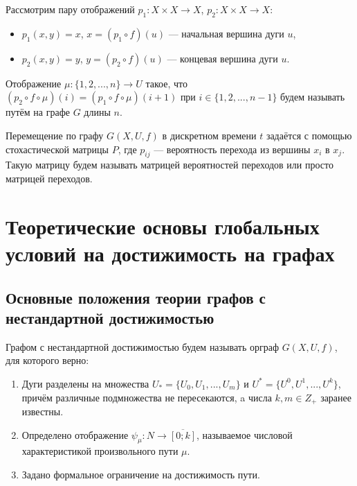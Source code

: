 	\begin{mydefinition}
		Рассмотрим пару отображений $p_1:X \times X\to X$, $p_2:X \times X\to X$:
		\begin{itemize}
			\item $p_1(x, y) = x$, $x = (p_1 \circ f)(u)$ --- начальная вершина дуги $u$,
			\item $p_2(x, y) = y$, $y = (p_2 \circ f)(u)$ --- концевая вершина дуги $u$.
		\end{itemize}
	\end{mydefinition}
	
	\begin{mydefinition}
		Отображение $\mu:\{1, 2, ... , n\} \to U$ такое, что 
		$(p_2 \circ f \circ \mu)(i) = (p_1 \circ f \circ \mu)(i + 1)$ при $i \in \{1, 2, ... , n-1\}$
		будем называть путём на графе $G$ длины $n$.
	\end{mydefinition}

	\begin{mydefinition}
		Перемещение по графу $G(X,U,f)$ в дискретном времени $t$ задаётся с помощью стохастической матрицы $P$, где $p_{ij}$ --- вероятность перехода из вершины $x_i$ в $x_j$.
		Такую матрицу будем называть матрицей вероятностей переходов или просто матрицей переходов.
	\end{mydefinition}
	
	\chapter{Теоретические основы глобальных условий на достижимость на графах}
		
	\section{Основные положения теории графов с нестандартной достижимостью}
	
	\begin{mydefinition}
		Графом с нестандартной достижимостью будем называть орграф $G(X,U,f)$, для которого верно:
		\begin{enumerate}
			\item Дуги разделены на множества $U_* = \{U_0, U_1, ... , U_m\}$ и $U^* = \{U^0, U^1, ... , U^k\}$, причём различные подмножества не пересекаются, a числа $k, m \in Z_+$ заранее известны.
			\item Определено отображение $\psi_\mu:N\to \overline{ [0; k] }$, называемое числовой характеристикой произвольного пути $\mu$.
			\item Задано формальное ограничение на достижимость пути.
		\end{enumerate}
	\end{mydefinition}
	
